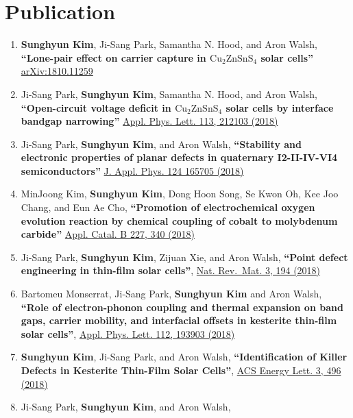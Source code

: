 \section{Publication}\label{publication}

\begin{enumerate}
\def\labelenumi{\arabic{enumi}.}
\item
  \textbf{Sunghyun Kim}, Ji-Sang Park, Samantha N. Hood, and Aron Walsh,
  \textbf{``Lone-pair effect on carrier capture in
  \(\mathrm{Cu_{2}ZnSnS_{4}}\) solar cells''}
  \href{https://arxiv.org/abs/1810.11259}{arXiv:1810.11259}
\item
  Ji-Sang Park, \textbf{Sunghyun Kim}, Samantha N. Hood, and Aron Walsh,
  \textbf{``Open-circuit voltage deficit in \(\mathrm{Cu_{2}ZnSnS_{4}}\)
  solar cells by interface bandgap narrowing''}
  \href{https://aip.scitation.org/doi/abs/10.1063/1.5063793}{Appl. Phys.
  Lett. 113, 212103 (2018)}
\item
  Ji-Sang Park, \textbf{Sunghyun Kim}, and Aron Walsh,
  \textbf{``Stability and electronic properties of planar defects in
  quaternary I2-II-IV-VI4 semiconductors''}
  \href{https://doi.org/10.1063/1.5053424}{J. Appl. Phys. 124 165705
  (2018)}
\item
  MinJoong Kim, \textbf{Sunghyun Kim}, Dong Hoon Song, Se Kwon Oh, Kee
  Joo Chang, and Eun Ae Cho, \textbf{``Promotion of electrochemical
  oxygen evolution reaction by chemical coupling of cobalt to molybdenum
  carbide''} \href{https://doi.org/10.1016/j.apcatb.2018.01.051}{Appl.
  Catal. B 227, 340 (2018)}
\item
  Ji-Sang Park, \textbf{Sunghyun Kim}, Zijuan Xie, and Aron Walsh,
  \textbf{``Point defect engineering in thin-film solar cells''},
  \href{https://doi.org/10.1038/s41578-018-0026-7}{Nat. Rev.~Mat. 3, 194
  (2018)}
\item
  Bartomeu Monserrat, Ji-Sang Park, \textbf{Sunghyun Kim} and Aron
  Walsh, \textbf{``Role of electron-phonon coupling and thermal
  expansion on band gaps, carrier mobility, and interfacial offsets in
  kesterite thin-film solar cells''},
  \href{https://doi.org/10.1063/1.5028186}{Appl. Phys. Lett. 112, 193903
  (2018)}
\item
  \textbf{Sunghyun Kim}, Ji-Sang Park, and Aron Walsh,
  \textbf{``Identification of Killer Defects in Kesterite Thin-Film
  Solar Cells''},
  \href{https://pubs.acs.org/doi/abs/10.1021/acsenergylett.7b01313}{ACS
  Energy Lett. 3, 496 (2018)}
\item
  Ji-Sang Park, \textbf{Sunghyun Kim}, and Aron Walsh,

\end{enumerate}
